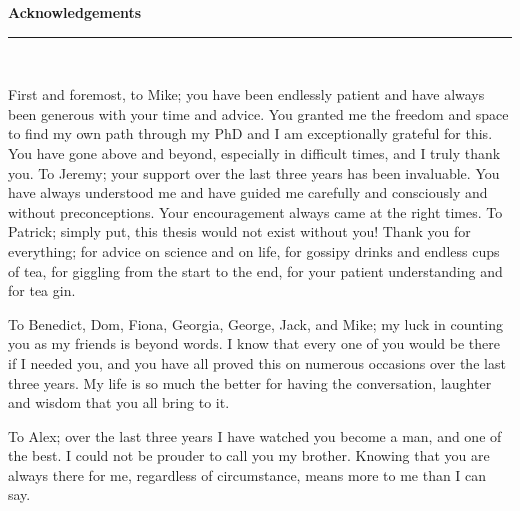 \thispagestyle{empty}
\begin{raggedleft}
\vspace*{23mm}
\hfill {\huge {\bf {Acknowledgements}}} \\
\vspace{6mm}
\hfill \rule{4in}{.015in} \\
\vspace{19mm}
\end{raggedleft}



\bigskip

\noindent First and foremost, to Mike;  you have been endlessly patient and have always been generous with your time and advice.  You granted me the freedom and space to find my own path through my PhD and I am exceptionally grateful for this.  You have gone above and beyond, especially in difficult times, and I truly thank you.
To Jeremy; your support over the last three years has been invaluable. You have always understood me and have guided me carefully and consciously and without preconceptions.    Your encouragement always came at the right times.  
To Patrick; simply put, this thesis would not exist without you!  Thank you for everything; for advice on science and on life, for gossipy drinks and endless cups of tea, for giggling from the start to the end, for your patient understanding and for tea gin. 

\bigskip 

\noindent To 
Benedict,
Dom,
Fiona,
Georgia,
George,
Jack,
and 
Mike;  my luck in counting you as my friends is beyond words.  I know that every one of you would be there if I needed you, and you have all proved this on numerous occasions over the last three years.  My life is so much the better for having the conversation, laughter and wisdom that you all bring to it.  

\clearpage

\noindent To Alex;  over the last three years I have watched you become a man, and one of the best.  I could not be prouder to call you my brother.  Knowing that you are always there for me, regardless of circumstance, means more to me than I can say. 

